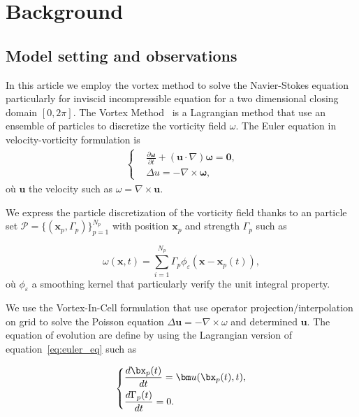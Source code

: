 
\section{Background}

\subsection*{Model setting and observations}

In this article we employ the vortex method to solve the Navier-Stokes equation particularly for inviscid incompressible equation for a two dimensional closing domain $[0, 2 \pi]$. The Vortex Method~\cite{cottet_vortex_2000} is a Lagrangian method that use an ensemble of particles to discretize the vorticity field $\omega$. The Euler equation in velocity-vorticity formulation is
\begin{gather}~\label{eq:euler_eq}
    \left\{\begin{aligned}
         & \frac{\partial \bm \omega}{\partial t} + (\bm{u} \cdot \nabla) \bm \omega  =  \bm 0, \\
         & \Delta u   =  -\nabla \times \bm \omega,
    \end{aligned} \right.
\end{gather}où $\bm{u}$ the velocity such as $\omega= \nabla \times \bm u$.

We express the particle discretization of the vorticity field thanks to an particle set $\mathcal P = \{(\bm x_p, \Gamma_p)\}_{p = 1}^{N_p}$ with position $\bm x_p$ and strength $\Gamma_p$ such as

\begin{equation*}
    \omega(\bm x, t) = \sum_{i=1}^{N_p} \Gamma_p \phi_\varepsilon(\bm x - \bm x_p(t)),
\end{equation*}où $\phi_\varepsilon$ a smoothing kernel that particularly verify the unit integral property.

We use the Vortex-In-Cell formulation that use operator projection/interpolation on grid to solve the Poisson equation $\Delta \bm u = - \nabla \times \omega$ and determined $\bm u$. The equation of evolution are define by using the Lagrangian version of equation~\eqref{eq:euler_eq} such as

\begin{gather*}
    \left\{\begin{aligned}
         & \frac{d \bx_p(t)}{dt} = \bm u(\bx_p(t), t), \\
         & \frac{d\Gamma_p(t)}{dt} = 0.
    \end{aligned}\right.
\end{gather*}

